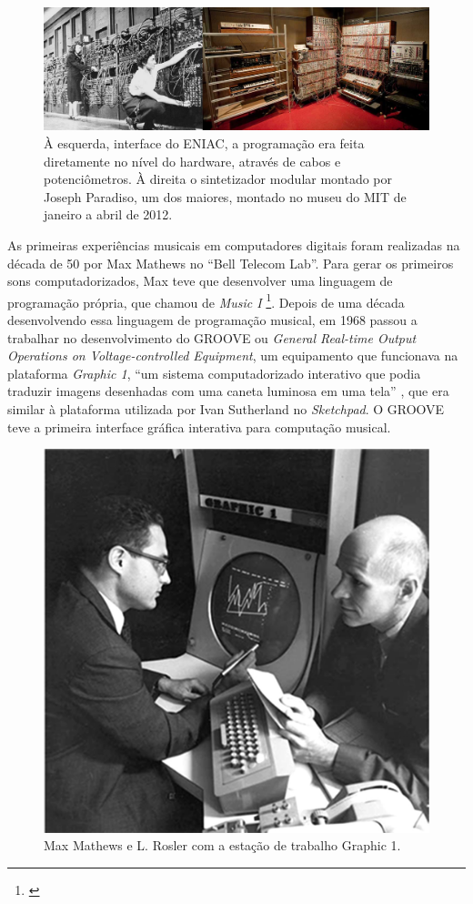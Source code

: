 \begin{figure}
    \caption{\label{analogicos}À esquerda, interface do ENIAC, a programação era feita diretamente no nível do hardware, através de cabos e potenciômetros.  À direita o sintetizador modular montado por Joseph Paradiso, um dos maiores, montado no museu do MIT de janeiro a abril de 2012.}
    
        \includegraphics[width=1\linewidth]{pictures/analogicos}
    
\end{figure}

As primeiras experiências musicais em computadores digitais foram realizadas na década de 50 por Max Mathews no ``Bell Telecom Lab''. Para gerar os primeiros sons computadorizados, Max teve que desenvolver uma linguagem de programação própria, que chamou de \emph{Music I} \footnote{\cite[253]{Holmes1985}}. Depois de uma década desenvolvendo essa linguagem de programação musical, em 1968 passou a trabalhar no desenvolvimento do GROOVE ou \emph{General Real-time Output Operations on Voltage-controlled Equipment}, um equipamento que funcionava na plataforma \emph{Graphic 1}, ``um sistema computadorizado interativo que podia traduzir imagens desenhadas com uma caneta luminosa em uma tela'' \cite[253]{Holmes1985}, que era similar à plataforma utilizada por Ivan Sutherland no \emph{Sketchpad}. O GROOVE teve a primeira interface gráfica interativa para computação musical. 

\begin{figure}
    \caption{\label{max}Max Mathews e L. Rosler com a estação de trabalho Graphic 1. }
    
        \includegraphics[width=0.5\linewidth]{pictures/MaxHolmes-251}
    
\end{figure}

